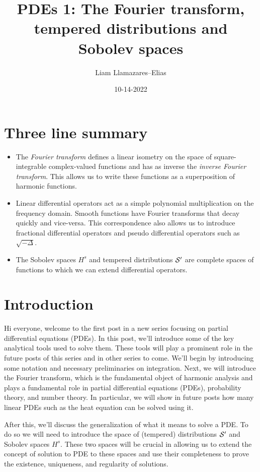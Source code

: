 \documentclass[
    a4paper,
    DIV=14,
    abstract=true,
    numbers=noenddot
]{scrartcl}
\begin{document}
	\title{PDEs 1: The Fourier transform, tempered distributions and Sobolev spaces}
	\author{Liam Llamazares--Elias}
	\date{10-14-2022}
	\maketitle
	\section*{ Three line summary }
	\begin{itemize}
		\item The \emph{Fourier transform} defines a linear isometry on the space of square-integrable complex-valued functions and has as inverse the \emph{inverse Fourier transform}. This allows us to write these functions as a superposition of harmonic functions.
		\item Linear differential operators act as a simple polynomial multiplication on the frequency domain. Smooth functions have Fourier transforms that decay quickly and vice-versa. This correspondence also allows us to introduce fractional differential operators and pseudo differential operators such as $\sqrt{-\Delta }$.
		\item The Sobolev spaces $H^s$ and tempered distributions  $\mathcal{S}'$ are complete spaces of functions to which we can extend differential operators.
	\end{itemize}
	\section*{Introduction}
	Hi everyone, welcome to the first post in a new series focusing on partial differential equations (PDEs). In this post, we'll introduce some of the key analytical tools used to solve them. These tools will play a prominent role in the future posts of this series and in other series to come.  We'll begin by introducing some notation and necessary preliminaries on integration. Next, we will introduce the Fourier transform, which is the fundamental object of harmonic analysis and plays a fundamental role in partial differential equations (PDEs), probability theory, and number theory. In particular, we will show in future posts how many linear PDEs such as the heat equation can be solved using it.

	

	After this, we'll discuss the generalization of what it means to solve a PDE. To do so we will need to introduce the space of (tempered) distributions $\mathcal{S}'$ and Sobolev spaces $H^s$.	These two spaces will be crucial in allowing us to extend the concept of solution to PDE to these spaces and use their completeness to prove the existence, uniqueness, and regularity of solutions.
\end{document}
